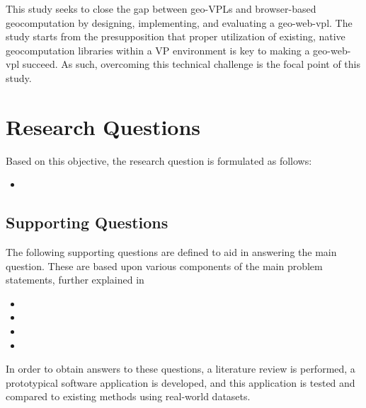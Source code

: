 This study seeks to close the gap between geo-VPLs and browser-based geocomputation by designing, implementing, and evaluating a \ac{geo-web-vpl}.
The study starts from the presupposition that proper utilization of existing, native geocomputation libraries within a VP environment is key to making a geo-web-vpl succeed. 
As such, overcoming this technical challenge is the focal point of this study. 

\section{Research Questions}
Based on this objective, the research question is formulated as follows: 
\begin{itemize}[ ]
  \item \myMainRQ
\end{itemize}

\subsection*{Supporting Questions}
The following supporting questions are defined to aid in answering the main question.
These are based upon various components of the main problem statements, further explained in 
\begin{itemize}[-]
  \item \mySubRQOne
  \item \mySubRQTwo
  \item \mySubRQThree
  \item \mySubRQFour
\end{itemize}
In order to obtain answers to these questions, a literature review is performed,
a prototypical software application is developed, 
and this application is tested and compared to existing methods using real-world datasets.







